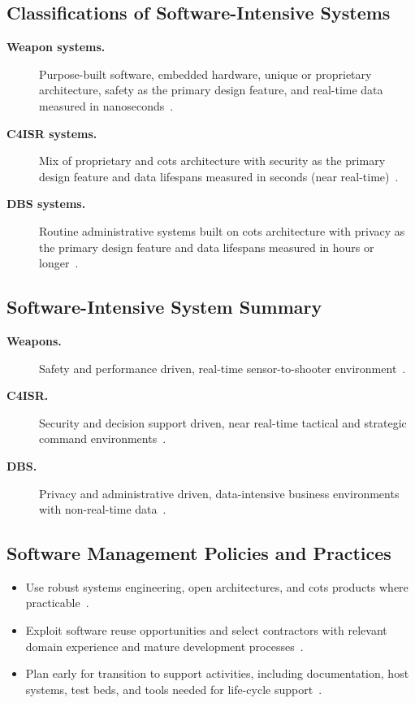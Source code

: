 \documentclass[../main.tex]{subfiles}
\begin{document}
\subsection{Classifications of Software-Intensive Systems}
\begin{description}
  \item[\textbf{Weapon systems.}] Purpose-built software, embedded hardware, unique or proprietary architecture, safety as the primary design feature, and real-time data measured in nanoseconds~\autocite{edo-3-4-1-software-acquisition-environment-2025}.
  \item[\textbf{C4ISR systems.}] Mix of proprietary and \ac{cots} architecture with security as the primary design feature and data lifespans measured in seconds (near real-time)~\autocite{edo-3-4-1-software-acquisition-environment-2025}.
  \item[\textbf{DBS systems.}] Routine administrative systems built on \ac{cots} architecture with privacy as the primary design feature and data lifespans measured in hours or longer~\autocite{edo-3-4-1-software-acquisition-environment-2025}.
\end{description}

\subsection{Software-Intensive System Summary}
\begin{description}
  \item[\textbf{Weapons.}] Safety and performance driven, real-time sensor-to-shooter environment~\autocite{edo-3-4-1-software-acquisition-environment-2025}.
  \item[\textbf{C4ISR.}] Security and decision support driven, near real-time tactical and strategic command environments~\autocite{edo-3-4-1-software-acquisition-environment-2025}.
  \item[\textbf{DBS.}] Privacy and administrative driven, data-intensive business environments with non-real-time data~\autocite{edo-3-4-1-software-acquisition-environment-2025}.
\end{description}

\subsection{Software Management Policies and Practices}
\begin{itemize}
  \item Use robust systems engineering, open architectures, and \ac{cots} products where practicable~\autocite{edo-3-4-1-software-acquisition-environment-2025}.
  \item Exploit software reuse opportunities and select contractors with relevant domain experience and mature development processes~\autocite{edo-3-4-1-software-acquisition-environment-2025}.
  \item Plan early for transition to support activities, including documentation, host systems, test beds, and tools needed for life-cycle support~\autocite{edo-3-4-1-software-acquisition-environment-2025}.
\end{itemize}
\end{document}
